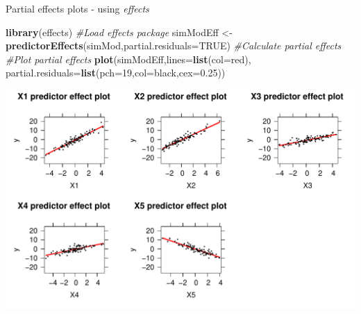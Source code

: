\documentclass[
  ignorenonframetext,
  aspectratio=169]{beamer}
\newenvironment{Shaded}{\begin{snugshade}}{\end{snugshade}}
\newcommand{\AttributeTok}[1]{\textcolor[rgb]{0.13,0.29,0.53}{#1}}
\newcommand{\CommentTok}[1]{\textcolor[rgb]{0.56,0.35,0.01}{\textit{#1}}}
\newcommand{\ConstantTok}[1]{\textcolor[rgb]{0.56,0.35,0.01}{#1}}
\newcommand{\DecValTok}[1]{\textcolor[rgb]{0.00,0.00,0.81}{#1}}
\newcommand{\FloatTok}[1]{\textcolor[rgb]{0.00,0.00,0.81}{#1}}
\newcommand{\FunctionTok}[1]{\textcolor[rgb]{0.13,0.29,0.53}{\textbf{#1}}}
\newcommand{\NormalTok}[1]{#1}
\newcommand{\OtherTok}[1]{\textcolor[rgb]{0.56,0.35,0.01}{#1}}
\newcommand{\StringTok}[1]{\textcolor[rgb]{0.31,0.60,0.02}{#1}}
\let\oldShaded\Shaded %
\let\endoldShaded\endShaded
\renewenvironment{Shaded}{\scriptsize\oldShaded}{\endoldShaded}
\begin{document}
\begin{frame}[fragile]{Partial effects plots - using \emph{effects}}
\protect\hypertarget{partial-effects-plots---using-effects}{}
\tiny

\begin{Shaded}
\begin{Highlighting}[]
\FunctionTok{library}\NormalTok{(effects) }\CommentTok{\#Load effects package}
\NormalTok{simModEff }\OtherTok{\textless{}{-}} \FunctionTok{predictorEffects}\NormalTok{(simMod,}\AttributeTok{partial.residuals=}\ConstantTok{TRUE}\NormalTok{) }\CommentTok{\#Calculate partial effects}
\CommentTok{\#Plot partial effects}
\FunctionTok{plot}\NormalTok{(simModEff,}\AttributeTok{lines=}\FunctionTok{list}\NormalTok{(}\AttributeTok{col=}\StringTok{\textquotesingle{}red\textquotesingle{}}\NormalTok{), }\AttributeTok{partial.residuals=}\FunctionTok{list}\NormalTok{(}\AttributeTok{pch=}\DecValTok{19}\NormalTok{,}\AttributeTok{col=}\StringTok{\textquotesingle{}black\textquotesingle{}}\NormalTok{,}\AttributeTok{cex=}\FloatTok{0.25}\NormalTok{))}
\end{Highlighting}
\end{Shaded}

\includegraphics{03-Lecture_files/figure-beamer/unnamed-chunk-18-1.pdf}
\end{frame}
\end{document}
